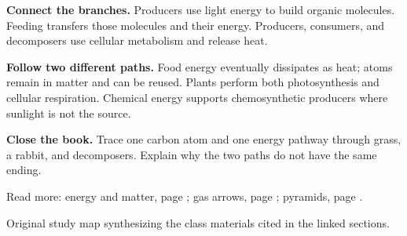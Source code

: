 \documentclass[11pt,letterpaper]{article}
\begin{document}
\par
\textbf{Connect the branches.} Producers use light energy to build organic molecules. Feeding transfers those molecules and their energy. Producers, consumers, and decomposers use cellular metabolism and release heat.
\par
\textbf{Follow two different paths.} Food energy eventually dissipates as heat; atoms remain in matter and can be reused. Plants perform both photosynthesis and cellular respiration. Chemical energy supports chemosynthetic producers where sunlight is not the source.
\par
\textbf{Close the book.} Trace one carbon atom and one energy pathway through grass, a rabbit, and decomposers. Explain why the two paths do not have the same ending.
\par
{\small Read more: energy and matter, page \pageref{onec}; gas arrows, page \pageref{gases}; pyramids, page \pageref{pyramids}.\par}
{\footnotesize Original study map synthesizing the class materials cited in the linked sections.\par}
\end{document}
